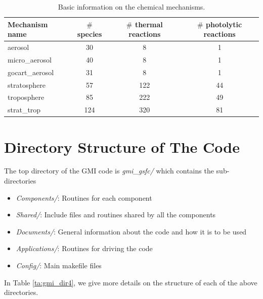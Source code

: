 {\small
\begin{center}
\begin{table}[!h]
\begin{tabular}{|l|c|c|c|} \hline\hline
Mechanism name      & $\#$ species & $\#$ thermal reactions & $\#$ photolytic reactions  \\ \hline\hline
aerosol         & 30  &  8  &  1  \\
micro\_aerosol  & 40  &  8  &  1  \\
gocart\_aerosol & 31  &  8  &  1  \\
stratosphere    & 57  & 122 & 44  \\
troposphere     & 85  & 222 & 49  \\
strat\_trop     & 124 & 320 & 81  \\ \hline\hline
\end{tabular}
\caption{Basic information on the chemical mechanisms.}
\label{tab:mecha}
\end{table}
\end{center}
}

%
\section{Directory Structure of The Code}
%
The top directory of the GMI code is {\em gmi\_gsfc/}
which contains the sub-directories 
%
\begin{itemize}
\item {\em Components/}: Routines for each component
\item {\em Shared/}: Include files and routines shared by all the components
\item {\em Documents/}: General information about the code and how it is to be used
\item {\em Applications/}: Routines for driving the code
\item {\em Config/}: Main makefile files
\end{itemize}
%
In Table \ref{ta:gmi_dir4}, 
we give more details on the structure of each of the above directories.

